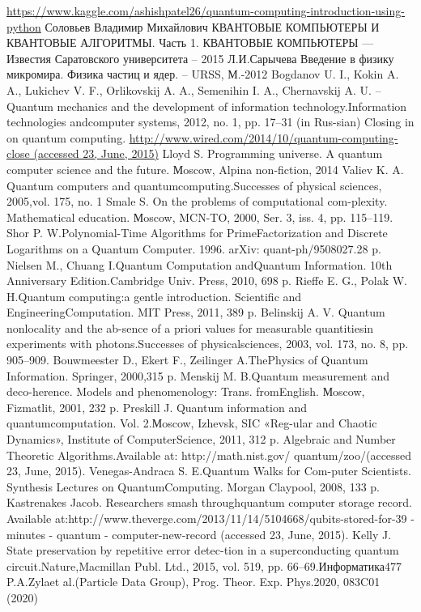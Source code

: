 \documentclass[11pt]{report}
\begin{document}
\begin{thebibliography}{3}
\url{https://www.kaggle.com/ashishpatel26/quantum-computing-introduction-using-python}
Соловьев Владимир Михайлович КВАНТОВЫЕ КОМПЬЮТЕРЫ И КВАНТОВЫЕ АЛГОРИТМЫ. Часть 1. КВАНТОВЫЕ КОМПЬЮТЕРЫ ---  Известия Саратовского университета -- 2015
Л.И.Сарычева Введение в физику микромира. Физика частиц и ядер. -- URSS, М.-2012
Bogdanov U. I., Kokin A. A., Lukichev V. F., Orlikovskij A. A., Semenihin I. A., Chernavskij A. U. -- Quantum mechanics and the development of information technology.Information technologies andcomputer systems, 2012, no. 1, pp. 17–31 (in Rus-sian) Closing   in   on   quantum   computing. \url{http://www.wired.com/2014/10/quantum-computing-close (accessed 23, June, 2015)}
Lloyd S. Programming universe. A quantum computer science and the future. Мoscow, Alpina non-fiction, 2014
Valiev K. A. Quantum computers and quantumcomputing.Successes of physical sciences, 2005,vol. 175, no. 1
Smale S. On the problems of computational com-plexity. Mathematical education. Мoscow, MCN-TO, 2000, Ser. 3, iss. 4, pp. 115–119.
Shor P. W.Polynomial-Time Algorithms for PrimeFactorization and Discrete Logarithms on a Quantum  Computer.  1996.  arXiv:  quant-ph/9508027.28 p.
Nielsen M., Chuang I.Quantum Computation andQuantum Information. 10th Anniversary Edition.Cambridge Univ. Press, 2010, 698 p.
Rieffe E. G., Polak W. H.Quantum computing:a gentle introduction. Scientific and EngineeringComputation. MIT Press, 2011, 389 p.
Belinskij A. V. Quantum nonlocality and the ab-sence of a priori values for measurable quantitiesin experiments with photons.Successes of physicalsciences, 2003, vol. 173, no. 8, pp. 905–909.
Bouwmeester  D.,  Ekert  F.,  Zeilinger  A.ThePhysics of Quantum Information. Springer, 2000,315 p.
Menskij M. B.Quantum measurement and deco-herence. Models and phenomenology: Trans. fromEnglish. Мoscow, Fizmatlit, 2001, 232 p.
Preskill  J. Quantum  information  and  quantumcomputation. Vol. 2.Мoscow, Izhevsk, SIC «Reg-ular and Chaotic Dynamics», Institute of ComputerScience, 2011, 312 p.
Algebraic  and  Number  Theoretic  Algorithms.Available at: http://math.nist.gov/ quantum/zoo/(accessed 23, June, 2015).
Venegas-Andraca S. E.Quantum Walks for Com-puter Scientists. Synthesis Lectures on QuantumComputing. Morgan Claypool, 2008, 133 p.
Kastrenakes  Jacob.  Researchers  smash  throughquantum computer storage record. Available at:http://www.theverge.com/2013/11/14/5104668/qubits-stored-for-39 - minutes - quantum - computer-new-record (accessed 23, June, 2015).
Kelly J. State preservation by repetitive error detec-tion in a superconducting quantum circuit.Nature,Macmillan Publ. Ltd., 2015, vol. 519, pp. 66–69.Информатика477
P.A.Zylaet al.(Particle Data Group), Prog. Theor. Exp. Phys.2020, 083C01 (2020)

\end{thebibliography}
\end{document}
